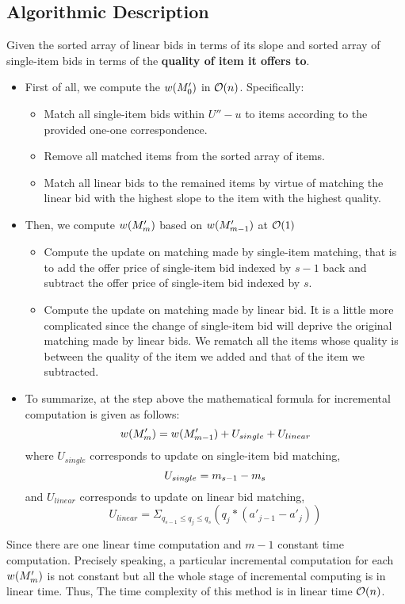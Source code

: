 \documentclass[11pt,a4paper]{article}
\begin{document}
\subsection{Algorithmic Description}
Given the sorted array of linear bids in terms of its slope and sorted array of
single-item bids in terms of the \textbf{quality of item it offers to}. 

\begin{itemize}
    \item{First of all, we compute the $w(M'_{0})$ in $\mathcal{O}(n)$.
        Specifically: }
        \begin{itemize}
            \item{Match all single-item bids within $U''-u$ to items according to
                the provided one-one correspondence.}
            \item{Remove all matched items from the sorted array of items.}
            \item{Match all linear bids to the remained items by virtue of
                    matching the linear bid with the highest slope to the item
                with the highest quality.}
        \end{itemize}
    \item{Then, we compute $w(M'_{m})$ based on $w(M'_{m-1})$ at $\mathcal{O}(1)$}
        \begin{itemize}
        \item{Compute the update on matching made by single-item matching,
                that is to add the offer price of single-item bid indexed by
                $s-1$ back and subtract the offer price of single-item bid
            indexed by $s$.}
        \item{Compute the update on matching made by linear bid. It is a
            little more complicated since the change of single-item bid will
        deprive the original matching made by linear bids. We rematch all the
        items whose quality is between the quality of the item we added
        and that of the item we subtracted.} 
    \end{itemize}
    \item{To summarize, at the step above the mathematical formula for
        incremental computation is given as follows: } $$ 
    w(M'_{m}) = w(M'_{m-1}) + U_{single} + U_{linear}
    $$ 
    where $U_{single}$ corresponds to update on single-item bid matching,
    $$ 
    U_{single} = m_{s-1} - m_{s}
    $$ 
    and $U_{linear}$ corresponds to update on linear bid matching,
    $$ 
    U_{linear} = \Sigma_{q_{s-1} \leq q_j \leq q_{s}} (q_j * (a'_{j-1} - a'_j)) 
    $$ 
\end{itemize}
 
Since there are one linear time computation and $m-1$ constant time
computation. Precisely speaking, a particular incremental computation for each
$w(M'_{m})$ is not constant but all the whole stage of incremental computing is
in linear time. Thus, The time complexity of this method is in linear time
$\mathcal{O}(n)$.

\end{document}
